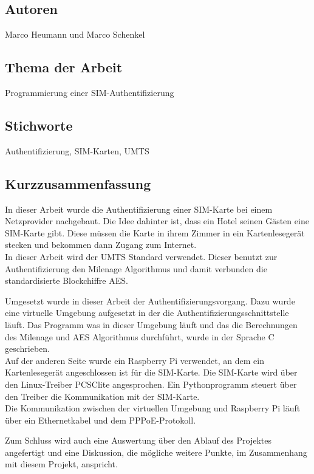 \subsection*{Autoren}
\begin{addmargin}[1em]{2em}
Marco Heumann und Marco Schenkel
\end{addmargin}

\subsection*{Thema der Arbeit}
\begin{addmargin}[1em]{2em}
Programmierung einer SIM-Authentifizierung
\end{addmargin}

\subsection*{Stichworte}
\begin{addmargin}[1em]{2em}
Authentifizierung, SIM-Karten, UMTS
\end{addmargin}

\subsection*{Kurzzusammenfassung}
\begin{addmargin}[1em]{2em}
In dieser Arbeit wurde die Authentifizierung einer SIM-Karte
bei einem Netzprovider nachgebaut. Die Idee dahinter ist, dass
ein Hotel seinen Gästen eine SIM-Karte gibt. Diese müssen die
Karte in ihrem Zimmer in ein Kartenlesegerät stecken und bekommen
dann Zugang zum Internet. \\
In dieser Arbeit wird der UMTS Standard verwendet. Dieser benutzt
zur Authentifizierung den Milenage Algorithmus und damit verbunden
die standardisierte Blockchiffre AES.

Umgesetzt wurde in dieser Arbeit der Authentifizierungsvorgang. Dazu
wurde eine virtuelle Umgebung aufgesetzt in der die Authentifizierungsschnittstelle
läuft. Das Programm was in dieser Umgebung läuft und das die Berechnungen
des Milenage und AES Algorithmus durchführt, wurde in der Sprache C
geschrieben. \\
Auf der anderen Seite wurde ein Raspberry Pi verwendet, an dem ein Kartenlesegerät
angeschlossen ist für die SIM-Karte. Die SIM-Karte wird über den Linux-Treiber
PCSClite angesprochen. Ein Pythonprogramm steuert über den Treiber die Kommunikation
mit der SIM-Karte. \\
Die Kommunikation zwischen der virtuellen Umgebung und Raspberry Pi läuft über
ein Ethernetkabel und dem PPPoE-Protokoll.

Zum Schluss wird auch eine Auswertung über den Ablauf des Projektes angefertigt und
eine Diskussion, die mögliche weitere Punkte, im Zusammenhang mit diesem Projekt,
anspricht.
\end{addmargin}